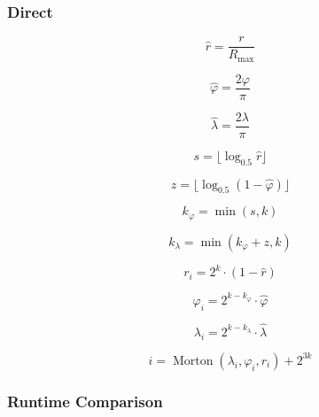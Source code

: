 \subsubsection{Direct}

\begin{equation*}
\hat{r} = \frac{r}{R_\mathrm{max}}
\end{equation*}

\begin{equation*}
\hat{\varphi} = \frac{2 \varphi}{\pi}
\end{equation*}

\begin{equation*}
\hat{\lambda} = \frac{2 \lambda}{\pi}
\end{equation*}

\begin{equation*}
s = \lfloor \log_{0.5} \hat{r} \rfloor
\end{equation*}

\begin{equation*}
z = \lfloor \log_{0.5} ( 1 - \hat{\varphi} ) \rfloor
\end{equation*}

\begin{equation*}
k_\varphi = \min ( s, k )
\end{equation*}

\begin{equation*}
k_\lambda = \min ( k_\varphi + z, k )
\end{equation*}

\begin{equation*}
r_i = 2^k \cdot ( 1 - \hat{r} )
\end{equation*}

\begin{equation*}
\varphi_i = 2^{k - k_\varphi} \cdot \hat{\varphi}
\end{equation*}

\begin{equation*}
\lambda_i = 2^{k - k_\lambda} \cdot \hat{\lambda}
\end{equation*}

\begin{equation*}
i = \operatorname{Morton}( \lambda_i, \varphi_i, r_i ) + 2^{3k}
\end{equation*}


\subsubsection{Runtime Comparison}


